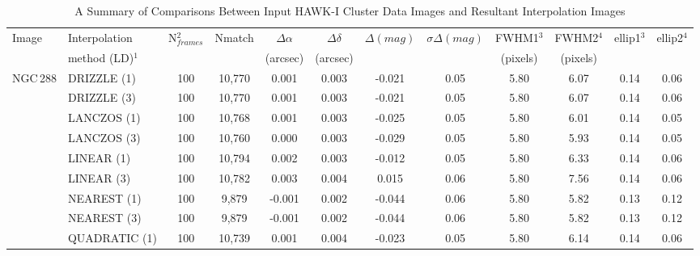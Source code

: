 \begin{table}

\caption{A Summary of Comparisons Between Input HAWK-I Cluster Data Images and Resultant Interpolation Images}

\begin{center}
\begin{tabular}{|l|l|c|c|c|c|c|c|c|c|c|c|}                      
\toprule

Image         				     		     & Interpolation	 & N$_{frames}^2$   & Nmatch & $\Delta\alpha$  & $\Delta\delta$ &  $\Delta(mag)$ & $\sigma\Delta(mag)$ & FWHM1$^3$  & FWHM2$^4$  & ellip1$^3$  & ellip2$^4$  \\
                                     & method (LD)$^1$ &                         &               & (arcsec)            & (arcsec)          &                          &                                   & (pixels)    & (pixels)   &            & \\
\midrule
NGC\,288         & DRIZZLE (1)        & 100   	& 10,770 	& 0.001       &  0.003  	& -0.021 & 0.05          & 5.80  	& 6.07		& 0.14    & 0.06   \\
 	   	       	& DRIZZLE (3)        & 100  	& 10,770 	& 0.001       &  0.003  	& -0.021 & 0.05 	  & 5.80  	& 6.07  		& 0.14    & 0.06  \\
 	               	& LANCZOS (1)      & 100  	& 10,768 	& 0.001       &  0.003  	& -0.025 & 0.05          & 5.80  	& 6.01  		& 0.14    & 0.05    \\
 	   	      	& LANCZOS (3)      & 100  	& 10,760 	& 0.000       &  0.003  	& -0.029 & 0.05          & 5.80  	& 5.93  		& 0.14    & 0.05    \\
 	              	& LINEAR (1)          & 100    	& 10,794 	& 0.002       &  0.003  	& -0.012 & 0.05          & 5.80  	& 6.33  		& 0.14    & 0.06    \\
 	              	& LINEAR (3)          & 100    	& 10,782 	& 0.003       &  0.004  	&  0.015 & 0.06          & 5.80  	& 7.56  		& 0.14    & 0.06    \\
 	              	& NEAREST (1)      & 100   	& 9,879 	& -0.001       & 0.002  	& -0.044 & 0.06          & 5.80  	& 5.82  		& 0.13    & 0.12    \\
 	              	& NEAREST (3)      & 100   	& 9,879 	& -0.001       & 0.002  	& -0.044 & 0.06          & 5.80  	& 5.82  		& 0.13    & 0.12    \\
 	              	& QUADRATIC (1)  & 100 	& 10,739 	& 0.001        & 0.004  	& -0.023 & 0.05          & 5.80  	& 6.14  		& 0.14    & 0.06    \\

\end{tabular}
\end{center}
\end{table}
